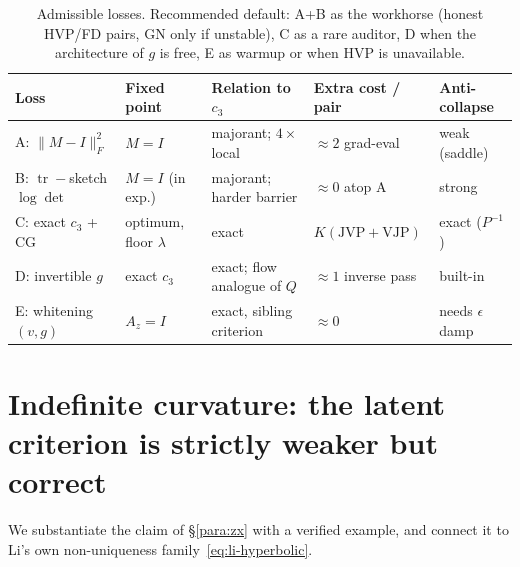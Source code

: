\documentclass[11pt]{article}
\theoremstyle{plain}
\theoremstyle{definition}
\theoremstyle{remark}
\DeclareMathOperator{\tr}{tr}
\newcommand{\Fnorm}[1]{\lVert #1 \rVert_F}
\begin{document}
\begin{table}[t]
\centering
\small
\renewcommand{\arraystretch}{1.2}
\begin{tabular}{@{}l l l l l@{}}
\toprule
Loss & Fixed point & Relation to $c_3$ & Extra cost / pair & Anti-collapse\\
\midrule
A: $\Fnorm{M-I}^2$ & $M=I$ & majorant; $4\times$ local & $\approx2$ grad-eval & weak (saddle)\\
B: $\tr-$sketch $\log\det$ & $M=I$ (in exp.) & majorant; harder barrier & $\approx0$ atop A & strong\\
C: exact $c_3$ + CG & optimum, floor $\lambda$ & exact & $K(\text{JVP}{+}\text{VJP})$ & exact ($P^{-1}$)\\
D: invertible $g$ & exact $c_3$ & exact; flow analogue of $Q$ & $\approx1$ inverse pass & built-in\\
E: whitening $(v,g)$ & $A_z=I$ & exact, sibling criterion & $\approx0$ & needs $\epsilon$ damp\\
\bottomrule
\end{tabular}
\caption{Admissible losses. Recommended default: A+B as the workhorse (honest HVP/FD pairs,
GN only if unstable), C as a rare auditor, D when the architecture of $g$ is free, E as
warmup or when HVP is unavailable.}
\label{tab:variants}
\end{table}

\section{Indefinite curvature: the latent criterion is strictly weaker but correct}
\label{sec:indefinite}

We substantiate the claim of \S\ref{para:zx} with a verified example, and connect it to
Li's own non-uniqueness family~\eqref{eq:li-hyperbolic}.
\end{document}
